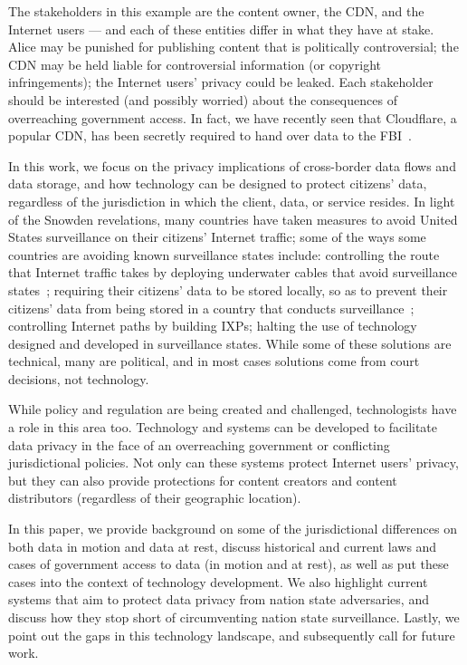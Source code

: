 The stakeholders in this 
example are the content owner, the CDN, and the Internet users --- and each of these entities differ in what 
they have at stake.  Alice may be punished for publishing content that is politically controversial; the CDN 
may be held liable for controversial information (or copyright infringements); the Internet users' 
privacy could be leaked.  Each stakeholder should be interested (and possibly worried) about the 
consequences of overreaching government access.  In fact, we have recently seen that Cloudflare, a popular 
CDN, has been secretly required to hand over data to the FBI~\cite{cloudflare_gag}.

In this work, we focus on the privacy implications of cross-border data flows and data 
storage, and how technology can be designed to protect citizens' data, regardless of the 
jurisdiction in which the client, data, or service resides.  In light of 
the Snowden revelations, many countries have taken 
measures to avoid United States surveillance on their citizens' Internet traffic; some of 
the ways some countries are avoiding known surveillance states include: controlling the route 
that Internet traffic takes by deploying underwater cables that avoid surveillance states~\cite{brazil}; 
requiring their citizens' data to be stored locally, so as to prevent their citizens' data from 
being stored in a country that conducts surveillance~\cite{russia}; controlling Internet paths by building 
IXPs; halting the use of technology designed and developed in surveillance states.  While some of these 
solutions are technical, many are political, and in most cases solutions come from court decisions, not 
technology.

While policy and regulation are being created and challenged, technologists have a role 
in this area too.  Technology and systems can be developed to facilitate data privacy in the 
face of an overreaching government or conflicting jurisdictional policies.  Not only can 
these systems protect Internet users' privacy, but they can also provide protections 
for content creators and content distributors (regardless of their geographic location).  

In this paper, we provide background on some of the jurisdictional differences 
on both data in motion and data at rest, discuss historical and current laws and cases of 
government access to data (in motion and at rest), as well as put these cases into the context 
of technology development. We also highlight current systems that aim to protect data privacy from nation 
state adversaries, and discuss how they stop short of circumventing nation state surveillance.  Lastly, we
 point out the gaps in this technology landscape, and 
subsequently call for future work.

